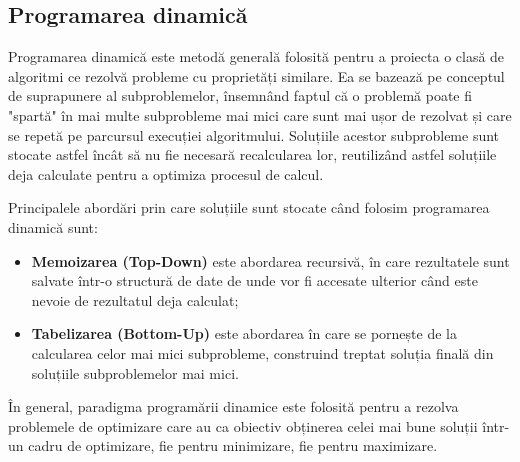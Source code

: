 \begin{sloppypar}
\subsection*{Programarea dinamică}
Programarea dinamică este metodă generală folosită pentru a proiecta o clasă de algoritmi ce rezolvă probleme cu proprietăți similare. \cite{Algorithm-Design} Ea se bazează pe conceptul de suprapunere al subproblemelor, însemnând faptul că o problemă poate fi "spartă" în mai multe subprobleme mai mici care sunt mai ușor de rezolvat și care se repetă pe parcursul execuției algoritmului. 
Soluțiile acestor subprobleme sunt stocate astfel încât să nu fie necesară recalcularea lor, reutilizând astfel soluțiile deja calculate pentru a optimiza procesul de calcul. \cite{DP-javatpoint} \par 
Principalele abordări prin care soluțiile sunt stocate când folosim programarea dinamică sunt:
\begin{itemize}
     \item \textbf{Memoizarea (Top-Down)} este abordarea recursivă, în care rezultatele sunt salvate într-o structură de date de unde vor fi accesate ulterior când este nevoie de rezultatul deja calculat;
     \item \textbf{Tabelizarea (Bottom-Up)} este abordarea în care se pornește de la calcularea celor mai mici subprobleme, construind treptat soluția finală din soluțiile subproblemelor mai mici. \cite{DP-GG}
\end{itemize} \par
În general, paradigma programării dinamice este folosită pentru a rezolva problemele de optimizare care au ca obiectiv obținerea celei mai bune soluții într-un cadru de optimizare, fie pentru minimizare, fie pentru maximizare. \par



\end{sloppypar}
